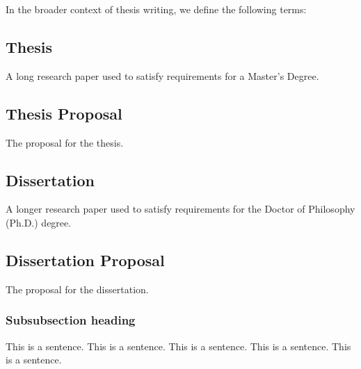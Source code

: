 In the broader context of thesis writing, we define the following terms:


\subsection{Thesis}

A long research paper used to satisfy requirements for a Master's Degree.


\subsection{Thesis Proposal}

The proposal for the thesis.


\subsection{Dissertation}

A longer research paper used to satisfy requirements for the Doctor of Philosophy (Ph.D.) degree.


\subsection{Dissertation Proposal}

The proposal for the dissertation.


\subsubsection{Subsubsection heading}

This is a sentence.
This is a sentence.
This is a sentence.
This is a sentence.
This is a sentence.
